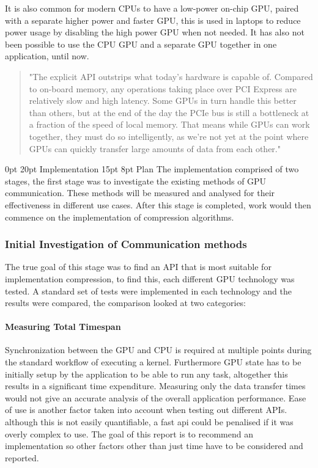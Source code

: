 \documentclass[12pt,a4paper]{article}
\makeatletter
\renewcommand\subsection{\@startsection {subsection}{1}{2mm} %
                               {15pt} %
                               {8pt} %
                               {\fontsize{13pt}{1em}\bfseries}}
\renewcommand\section{\@startsection {section}{1}{0mm} %
                               {0pt} %
                               {20pt} %
                               {\fontsize{14pt}{1em}\bfseries\newpage}}
\makeatother
\begin{document}
It is also common for modern CPUs to have a low-power on-chip GPU, paired with a separate higher power and faster GPU, this is used in laptops to reduce power usage by disabling the high power GPU when not needed.
It has also not been possible to use the CPU GPU and a separate GPU together in one application, until now.



 \blockquote[\cite{amdoclguide}]{"The explicit API outstrips what today’s hardware is capable of. Compared to on-board memory, any operations taking place over PCI Express are relatively slow and high latency. Some GPUs in turn handle this better than others, but at the end of the day the PCIe bus is still a bottleneck at a fraction of the speed of local memory. That means while GPUs can work together, they must do so intelligently, as we’re not yet at the point where GPUs can quickly transfer large amounts of data from each other."}

\section{Implementation}
\subsection{Plan}
The implementation comprised of two stages, the first stage was to investigate the existing methods of GPU communication. These methods will be measured and analysed for their effectiveness in different use cases. After this stage is completed, work would then commence on the implementation of compression algorithms.

\subsubsection{Initial Investigation of Communication methods}
The true goal of this stage was to find an API that is most suitable for implementation compression, to find this, each different GPU technology was tested. A standard set of tests were implemented in each technology and the results were compared, the comparison looked at two categories:

\paragraph{Measuring Total Timespan}
Synchronization between the GPU and CPU is required at multiple points during the standard workflow of executing a kernel. Furthermore GPU state has to be initially setup by the application to be able to run any task, altogether this results in a significant time expenditure.  Measuring only the data transfer times would not give an accurate analysis of the overall application performance. 
Ease of use is another factor taken into account when testing out different APIs. although this is not easily quantifiable, a fast api could be penalised if it was overly complex to use. The goal of this report is to recommend an implementation so other factors other than just time have to be considered and reported.
\end{document}

